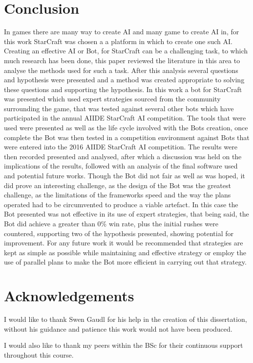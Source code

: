 \documentclass[journal]{IEEEtran}
\begin{document}
	\section{Conclusion}
	In games there are many way to create AI and many game to create AI in, for this work StarCraft was chosen a a platform in which to create one such AI. Creating an effective AI or Bot, for StarCraft can be a challenging task, to which much research has been done, this paper reviewed the literature in this area to analyse the methods used for such a task. After this analysis several questions and hypothesis were presented and a method was created appropriate to solving these questions and supporting the hypothesis.	In this work a bot for StarCraft was presented which used expert strategies sourced from the community surrounding the game, that was tested against several other bots which have participated in the annual AIIDE StarCraft AI competition. The tools that were used were presented as well as the life cycle involved with the Bots creation, once complete the Bot was then tested in a competition environment against Bots that were entered into the 2016 AIIDE StarCraft AI competition. The results were then recorded presented and analysed, after which a discussion was held on the implications of the results, followed with an analysis of the final software used and potential future works. 
	Though the Bot did not fair as well as was hoped, it did prove an interesting challenge, as the design of the Bot was the greatest challenge, as the limitations of the frameworks speed and the way the plans operated had to be circumvented to produce a viable artefact. In this case the Bot presented was not effective in its use of expert strategies, that being said, the Bot did achieve a greater than 0\% win rate, plus the initial rushes were countered, supporting two of the hypothesis presented, showing potential for improvement. For any future work it would be recommended that strategies are kept as simple as possible while maintaining and effective strategy or employ the use of parallel plans to make the Bot more efficient in carrying out that strategy.	
	
	\section{Acknowledgements}
	I would like to thank Swen Gaudl for his help in the creation of this dissertation, without his guidance and patience this work would not have been produced.
	
	I would also like to thank my peers within the BSc for their continuous support throughout this course.
	
\end{document}
